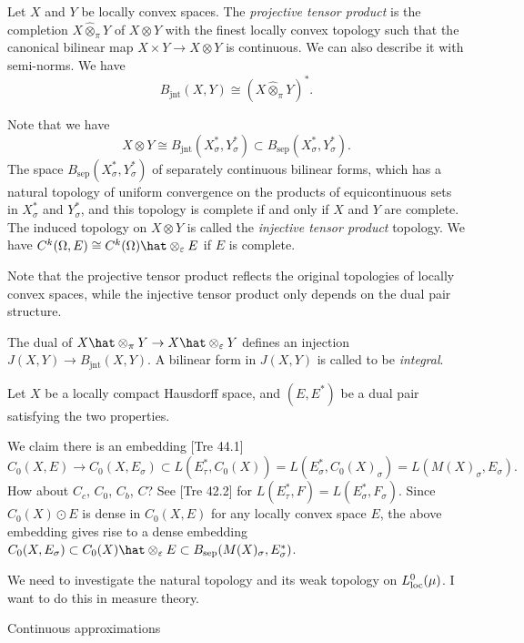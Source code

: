 \documentclass{../../large}
\begin{document}
\begin{prb}
Let $X$ and $Y$ be locally convex spaces.
The \emph{projective tensor product} is the completion $X\hat\otimes_\pi Y$ of $X\otimes Y$ with the finest locally convex topology such that the canonical bilinear map $X\times Y\to X\otimes Y$ is continuous.
We can also describe it with semi-norms.
We have
\[B_{\mathrm{jnt}}(X,Y)\cong(X\hat\otimes_\pi Y)^*.\]


Note that we have
\[X\otimes Y\cong B_{\mathrm{jnt}}(X_\sigma^*,Y_\sigma^*)\subset B_{\mathrm{sep}}(X_\sigma^*,Y_\sigma^*).\]
The space $B_{\mathrm{sep}}(X_\sigma^*,Y_\sigma^*)$ of separately continuous bilinear forms, which has a natural topology of uniform convergence on the products of equicontinuous sets in $X_\sigma^*$ and $Y_\sigma^*$, and this topology is complete if and only if $X$ and $Y$ are complete.
The induced topology on $X\otimes Y$ is called the \emph{injective tensor product} topology.
We have $C^k(\Omega,E)\cong C^k(\Omega)\hat\otimes_\e E$ if $E$ is complete.

Note that the projective tensor product reflects the original topologies of locally convex spaces, while the injective tensor product only depends on the dual pair structure.

The dual of $X\hat\otimes_\pi Y\to X\hat\otimes_\e Y$ defines an injection $J(X,Y)\to B_{\mathrm{jnt}}(X,Y)$.
A bilinear form in $J(X,Y)$ is called to be \emph{integral}.
\end{prb}


\begin{prb}
Let $X$ be a locally compact Hausdorff space, and $(E,E^*)$ be a dual pair satisfying the two properties.

We claim there is an embedding [Tre 44.1]
\[C_0(X,E)\to C_0(X,E_\sigma)\subset L(E^*_\tau,C_0(X))=L(E^*_\sigma,C_0(X)_\sigma)=L(M(X)_\sigma, E_\sigma).\]
How about $C_c$, $C_0$, $C_b$, $C$?
See [Tre 42.2] for $L(E_\tau^*,F)=L(E_\sigma^*,F_\sigma)$.
Since $C_0(X)\odot E$ is dense in $C_0(X,E)$ for any locally convex space $E$, the above embedding gives rise to a dense embedding $C_0(X,E_\sigma)\subset C_0(X)\hat\otimes_\e E\subset B_{\mathrm{sep}}(M(X)_\sigma,E^*_\sigma)$.
\end{prb}

\begin{prb}
We need to investigate the natural topology and its weak topology on $L_{\mathrm{loc}}^0(\mu)$.
I want to do this in measure theory.

Continuous approximations
\end{prb}
\end{document}
